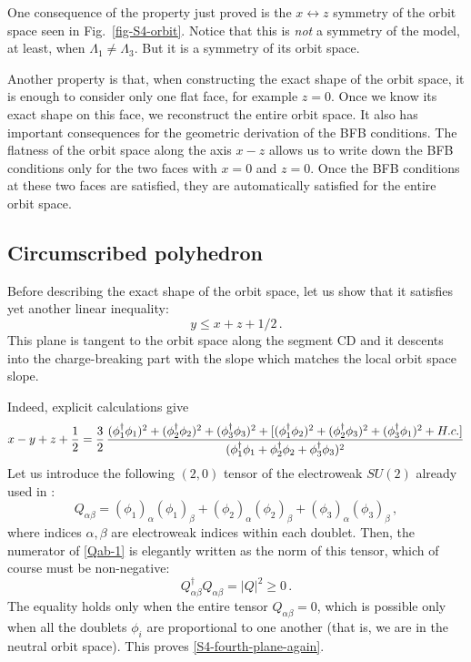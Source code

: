 \documentclass[11pt]{article}
\begin{document}
One consequence of the property just proved is the $x \leftrightarrow z$ symmetry
of the orbit space seen in Fig.~\ref{fig-S4-orbit}.
Notice that this is {\em not} a symmetry of the model, at least, when $\Lambda_1 \not = \Lambda_3$.
But it is a symmetry of its orbit space.

Another property is that, when constructing the exact shape of the orbit space,
it is enough to consider only one flat face, for example $z = 0$.
Once we know its exact shape on this face, we reconstruct the entire orbit space.
It also has important consequences for the geometric derivation of the BFB conditions. 
The flatness of the orbit space along the axis $x-z$ allows us to write down the BFB conditions 
only for the two faces with $x=0$ and $z=0$.
Once the BFB conditions at these two faces are satisfied, they are automatically satisfied for the 
entire orbit space.

\subsection{Circumscribed polyhedron}\label{appendix:S4.poly}

Before describing the exact shape of the orbit space, let us show that
it satisfies yet another linear inequality:
\begin{equation}
y \le x+z+1/2\,.\label{S4-fourth-plane-again} 
\end{equation}
This plane is tangent to the orbit space along the segment CD and it descents into the charge-breaking part
with the slope which matches the local orbit space slope.

Indeed, explicit calculations give
\begin{equation}
x-y+z+{1\over 2} = {3 \over 2}\,\frac{(\phi_1^\dagger\phi_1)^2+(\phi_2^\dagger\phi_2)^2+(\phi_3^\dagger\phi_3)^2 + 
	[(\phi_1^\dagger\phi_2)^2 + (\phi_2^\dagger\phi_3)^2 + (\phi_3^\dagger\phi_1)^2 + H.c.]}{(\phi_1^\dagger\phi_1+\phi_2^\dagger\phi_2+\phi_3^\dagger\phi_3)^2}
\label{Qab-1}
\end{equation}
Let us introduce the following $(2,0)$ tensor of the electroweak $SU(2)$ already used in \cite{Degee:2012sk}:
\begin{equation}
Q_{\alpha\beta} = (\phi_1)_\alpha (\phi_1)_\beta + (\phi_2)_\alpha (\phi_2)_\beta + (\phi_3)_\alpha (\phi_3)_\beta \,,
\end{equation}
where indices $\alpha, \beta$ are electroweak indices within each doublet.
Then, the numerator of \eqref{Qab-1} is elegantly written as the norm of this tensor, which of course must be non-negative:
\begin{equation}
Q_{\alpha\beta}^\dagger Q_{\alpha\beta} = |Q|^2 \ge 0\,.
\end{equation}
The equality holds only when the entire tensor $Q_{\alpha\beta} = 0$, which is possible only when all the doublets 
$\phi_i$ are proportional to one another (that is, we are in the neutral orbit space).
This proves \eqref{S4-fourth-plane-again}.
\end{document}
